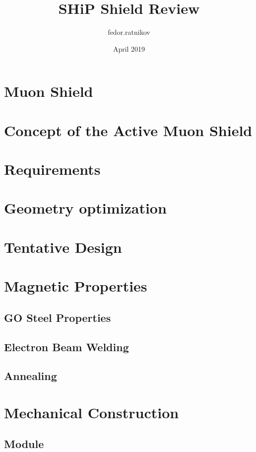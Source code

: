 \documentclass{article}
\title{SHiP Shield Review}
\author{fedor.ratnikov }
\date{April 2019}
\begin{document}
\maketitle

\section{Muon Shield}

\section{Concept of the Active Muon Shield}

\section{Requirements}

\section{Geometry optimization}

\section{Tentative Design}

\section{Magnetic Properties}

\subsection{GO Steel Properties}

\subsection{Electron Beam Welding}

\subsection{Annealing}

\section{Mechanical Construction}

\subsection{Module}
\end{document}
